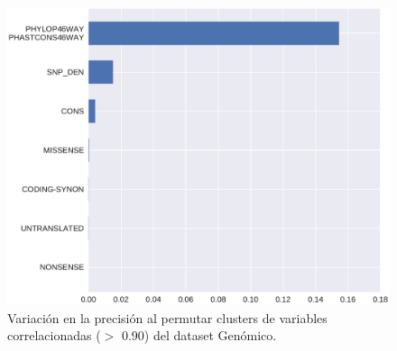 \begin{figure}[H]
    \centering
    \includegraphics[scale=0.5]{documents/latex/figures/3/genomic/genomic_importance_cluster.pdf}
    \caption{Variación en la precisión al permutar clusters de variables correlacionadas ($>$ 0.90) del dataset Genómico.}
    \label{fig:importance_genomic_cluster}
\end{figure}


\newpage

